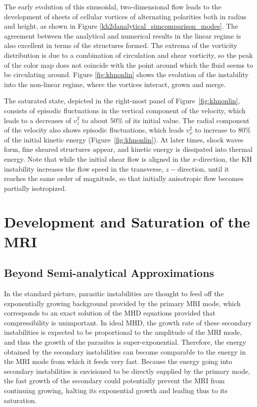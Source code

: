 \documentclass[]{emulateapj}
\begin{document}
The early evolution of this sinusoidal, two-dimensional flow leads to
the development of sheets of cellular vortices of alternating
polarities both in radius and height, as shown in Figure
\ref{kh2danalytical_simcomparison_modes}.  The agreement between the
analytical and numerical results in the linear regime is also
excellent in terms of the structures formed.  The extrema of the
vorticity distribution is due to a combination of circulation and
shear vorticity, so the peak of the color map does not coincide with
the point around which the fluid seems to be circulating around.  
Figure  \ref{fig:khnonlin} shows the evolution of the instability into
the non-linear regime, where the vortices interact, grown and merge. 

The saturated state, depicted in the right-most panel of Figure~\ref{fig:khnonlin},
consists of episodic fluctuations in the vertical component of the velocity, 
which leads to a decreases of $v_z^2$ to about 50\% of its initial value.
The radial component of the velocity also shows episodic fluctuations,
which leads $v_x^2$ to increase to 80\% of the initial kinetic energy
(Figure~\ref{fig:khnonlin}). At later times, shock waves form, fine
sheared structures appear, and kinetic energy is dissipated into
thermal energy.  Note that while the initial shear flow is aligned in
the $x$-direction, the KH instability increases the flow speed in the
transverse, $z-$direction, until it reaches the same order of
magnitude, so that initially anisotropic flow becomes partially
isotropized.





\section{Development and Saturation of the MRI}
\label{latelinearMRI} 

\subsection{Beyond Semi-analytical Approximations }

In the standard picture, parasitic instabilities are thought to feed
off the exponentially growing background provided by the primary MRI
mode, which corresponds to an exact solution of the MHD equations
provided that compressibility is unimportant. In ideal MHD, the growth
rate of these secondary instabilities is expected to be proportional
to the amplitude of the MRI mode, and thus the growth of the parasites
is super-exponential. Therefore, the energy
obtained by the secondary instabilities can become comparable to the
energy in the MRI mode from which it feeds very fast.  Because the energy going
into secondary instabilities is envisioned to be directly supplied by the primary mode,
the fast growth of the secondary could potentially prevent the MRI
from continuing growing, halting its exponential growth and leading
thus to its saturation.
\end{document}
